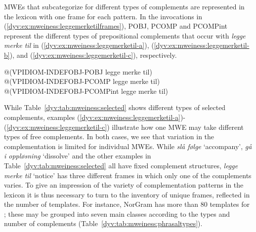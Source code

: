 \documentclass[output=paper]{langsci/langscibook}
\begin{document}
MWEs that subcategorize for different types of complements are represented in the lexicon with one frame for each  pattern.
In the  invocations in (\ref{dyv:ex:mweiness:leggemerketilframes}), POBJ, PCOMP and PCOMPint represent the different types of prepositional complements that occur with \emph{legge merke til} in (\ref{dyv:ex:mweiness:leggemerketil-a}), (\ref{dyv:ex:mweiness:leggemerketil-b}), and (\ref{dyv:ex:mweiness:leggemerketil-c}), respectively.

\ea\label{dyv:ex:mweiness:leggemerketilframes}
\begin{xlist}
\ex \label{dyv:ex:mweiness:leggemerketilframes-a}@(VPIDIOM-INDEFOBJ-POBJ legge merke til) \\ 
\ex \label{dyv:ex:mweiness:leggemerketilframes-b}@(VPIDIOM-INDEFOBJ-PCOMP  legge merke til) \\
\ex \label{dyv:ex:mweiness:leggemerketilframes-c}@(VPIDIOM-INDEFOBJ-PCOMPint legge merke til) \\
\end{xlist}
\z	


While Table~\ref{dyv:tab:mweiness:selected} shows different types of selected complements, examples (\ref{dyv:ex:mweiness:leggemerketil-a})-(\ref{dyv:ex:mweiness:leggemerketil-c}) illustrate how one MWE may take different types of free complements.
In both cases, we see that variation in the complementation is limited for individual MWEs.
While \emph{slå følge} `accompany', \emph{gå i oppløsning} `dissolve' and the other examples in Table~\ref{dyv:tab:mweiness:selected} all have fixed complement structures, \emph{legge merke til} `notice' has three different frames in which only one of the complements varies.
To give an impression of the variety of complementation patterns in the lexicon it is thus necessary to turn to the inventory of unique frames, reflected in the number of templates.
For instance, NorGram has more than 80 templates for ; these may be grouped into seven main classes according to the types and number of complements (Table~\ref{dyv:tab:mweiness:phrasaltypes}). %
\end{document}
